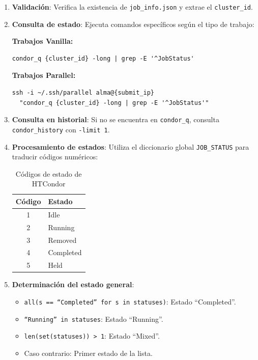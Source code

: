 \begin{enumerate}
	\item \textbf{Validación}: Verifica la existencia de \texttt{job\_info.json} y extrae el \texttt{cluster\_id}.

	\item \textbf{Consulta de estado}: Ejecuta comandos específicos según el tipo de trabajo:

	      \textbf{Trabajos Vanilla:}
	      \begin{verbatim}
condor_q {cluster_id} -long | grep -E '^JobStatus'
	      \end{verbatim}

	      \textbf{Trabajos Parallel:}
	      \begin{verbatim}
ssh -i ~/.ssh/parallel alma@{submit_ip} 
  "condor_q {cluster_id} -long | grep -E '^JobStatus'"
	      \end{verbatim}

	\item \textbf{Consulta en historial}: Si no se encuentra en \texttt{condor\_q}, consulta \texttt{condor\_history} con \texttt{-limit 1}.

	\item \textbf{Procesamiento de estados}: Utiliza el diccionario global \texttt{JOB\_STATUS} para traducir códigos numéricos:

	      \begin{table}[H]
		      \centering
		      \begin{tabular}{|c|l|}
			      \hline
			      \textbf{Código} & \textbf{Estado} \\
			      \hline
			      1               & Idle            \\
			      2               & Running         \\
			      3               & Removed         \\
			      4               & Completed       \\
			      5               & Held            \\
			      \hline
		      \end{tabular}
		      \caption{Códigos de estado de HTCondor}
		      \label{tab:job-status-codes}
	      \end{table}

	\item \textbf{Determinación del estado general}:
	      \begin{itemize}
		      \item \texttt{all(s == ``Completed'' for s in statuses)}: Estado ``Completed''.
		      \item \texttt{``Running'' in statuses}: Estado ``Running''.
		      \item \texttt{len(set(statuses)) > 1}: Estado ``Mixed''.
		      \item Caso contrario: Primer estado de la lista.
	      \end{itemize}
\end{enumerate}

